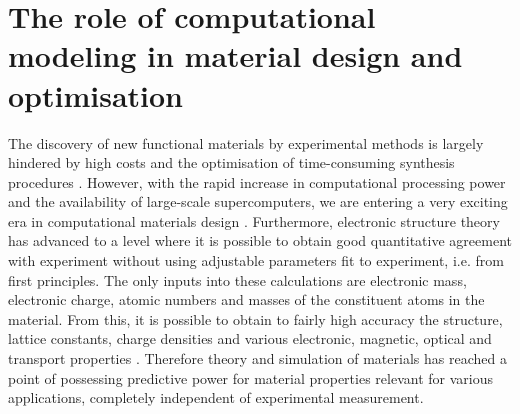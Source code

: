 \documentclass[11pt, twoside]{report}
\begin{document}
\section{The role of computational modeling in material design and optimisation}
The discovery of new functional materials by experimental methods is largely hindered by high costs and the optimisation of time-consuming synthesis procedures \cite{high_tp}.
However, with the rapid increase in computational processing power and the availability of large-scale supercomputers, we are entering a very exciting era in computational materials design \cite{WMD_material_design_review}. Furthermore, electronic structure theory has advanced to a level where it is possible to obtain good quantitative agreement with experiment without using adjustable parameters fit to experiment, i.e. from first principles. The only inputs into these calculations are electronic mass, electronic charge, atomic numbers and masses of the constituent atoms in the material. From this, it is possible to obtain to fairly high accuracy the structure, lattice constants, charge densities and various electronic, magnetic, optical and transport properties \cite{RichardMartin_Ch1}. Therefore theory and simulation of materials has reached a point of possessing predictive power for material properties relevant for various applications, completely independent of experimental measurement.
\end{document}

